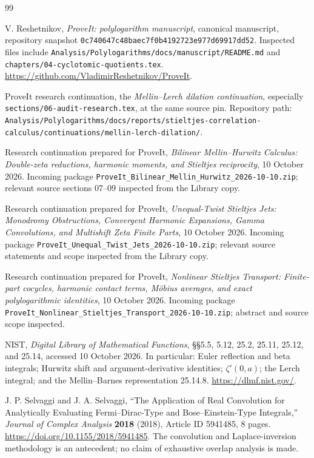 \documentclass[11pt,a4paper]{article}
\numberwithin{equation}{section}
\theoremstyle{definition}\newtheorem{definition}[theorem]{Definition}
\theoremstyle{remark}\newtheorem{remark}[theorem]{Remark}
\newcommand{\src}[1]{\nolinkurl{#1}}
\newcommand{\pin}{\src{0c740647c48baec7f0b4192723e977d69917dd52}}
\begin{document}
\begin{thebibliography}{99}
V. Reshetnikov, \emph{ProveIt: polylogarithm manuscript}, canonical manuscript, repository snapshot
\pin. Inspected files include
\src{Analysis/Polylogarithms/docs/manuscript/README.md} and
\src{chapters/04-cyclotomic-quotients.tex}.
\url{https://github.com/VladimirReshetnikov/ProveIt}.

ProveIt research continuation, the \emph{Mellin--Lerch dilation continuation}, especially
\src{sections/06-audit-research.tex}, at the same source pin.
Repository path:
\src{Analysis/Polylogarithms/docs/reports/stieltjes-correlation-calculus/continuations/mellin-lerch-dilation/}.

Research continuation prepared for ProveIt,
\emph{Bilinear Mellin--Hurwitz Calculus: Double-zeta reductions, harmonic
moments, and Stieltjes reciprocity}, 10 October 2026.
Incoming package \src{ProveIt_Bilinear_Mellin_Hurwitz_2026-10-10.zip};
relevant source sections 07--09 inspected from the Library copy.

Research continuation prepared for ProveIt,
\emph{Unequal-Twist Stieltjes Jets: Monodromy Obstructions, Convergent
Harmonic Expansions, Gamma Convolutions, and Multishift Zeta Finite Parts},
10 October 2026. Incoming package
\src{ProveIt_Unequal_Twist_Jets_2026-10-10.zip}; relevant source
statements and scope inspected from the Library copy.

Research continuation prepared for ProveIt,
\emph{Nonlinear Stieltjes Transport: Finite-part cocycles, harmonic contact
terms, M\"obius averages, and exact polylogarithmic identities},
10 October 2026. Incoming package
\src{ProveIt_Nonlinear_Stieltjes_Transport_2026-10-10.zip};
abstract and source scope inspected.

NIST, \emph{Digital Library of Mathematical Functions},
\S\S5.5, 5.12, 25.2, 25.11, 25.12, and 25.14, accessed
10 October 2026. In particular: Euler reflection and beta integrals;
Hurwitz shift and argument-derivative identities;
$\zeta'(0,a)$; the Lerch integral; and the Mellin--Barnes representation
25.14.8.
\url{https://dlmf.nist.gov/}.

J. P. Selvaggi and J. A. Selvaggi,
``The Application of Real Convolution for Analytically Evaluating
Fermi--Dirac-Type and Bose--Einstein-Type Integrals,''
\emph{Journal of Complex Analysis} \textbf{2018} (2018),
Article ID 5941485, 8 pages.
\url{https://doi.org/10.1155/2018/5941485}.
The convolution and Laplace-inversion methodology is an antecedent;
no claim of exhaustive overlap analysis is made.
\end{thebibliography}

\end{document}
